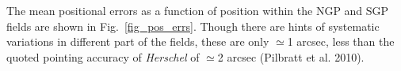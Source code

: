 \documentclass[useAMS,usenatbib]{mn2e}
\begin{document}

The mean positional errors as a function of position within the NGP
and SGP fields are shown in Fig.~\ref{fig_pos_errs}. Though there are
hints of systematic variations in different part of the fields, 
these are only $\simeq$1 arcsec, less than the
quoted pointing accuracy of {\it Herschel} of
$\simeq$2 arcsec (Pilbratt et al. 2010).
\end{document}

